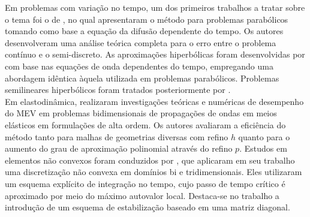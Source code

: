 \indent Em problemas com variação no tempo, um dos primeiros trabalhos a tratar sobre o tema foi o de \citet{virtualelementmethodsparabolicproblemspolygonalmeshes2015a}, no qual apresentaram o método para problemas parabólicos tomando como base a equação da difusão dependente do tempo. Os autores desenvolveram uma análise teórica completa para o erro entre o problema contínuo e o semi-discreto. As aproximações hiperbólicas foram desenvolvidas por \citet{virtualelementmethodshyperbolicproblemspolygonalmeshes2017} com base nas equações de onda dependentes do tempo, empregando uma abordagem idêntica àquela utilizada em problemas parabólicos. Problemas semilineares hiperbólicos foram tratados posteriormente por \citet{virtualelementmethodsemilinearhyperbolicproblemspolygonalmeshes2019}. \\
\indent Em elastodinâmica, \citet{antonietti2020virtual} realizaram investigações teóricas e numéricas de desempenho do MEV em problemas bidimensionais de propagações de ondas em meios elásticos em formulações de alta ordem. Os autores avaliaram a eficiência do método tanto para malhas de geometrias diversas com refino $h$ quanto para o aumento do grau de aproximação polinomial através do refino $p$. Estudos em elementos não convexos foram conduzidos por \citet{nonconvexmesheselastodynamicsusingvirtualelementmethodsexplicittimeintegration2019a}, que aplicaram em seu trabalho uma discretização não convexa em domínios bi e tridimensionais. Eles utilizaram um esquema explícito de integração no tempo, cujo passo de tempo crítico é aproximado por meio do máximo autovalor local. Destaca-se no trabalho a introdução de um esquema de estabilização baseado em uma matriz diagonal. \\

